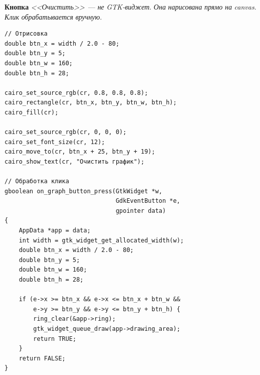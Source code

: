 \textbf{Кнопка} \emph{<<Очистить>>}~--- \emph{не} \emph{GTK-виджет}.
\emph{Она} \emph{нарисована} \emph{прямо} \emph{на} \emph{canvas}.
\emph{Клик} \emph{обрабатывается} \emph{вручную}.

\begin{listing}[htbp]
\begin{verbatim}
// Отрисовка
double btn_x = width / 2.0 - 80;
double btn_y = 5;
double btn_w = 160;
double btn_h = 28;

cairo_set_source_rgb(cr, 0.8, 0.8, 0.8);
cairo_rectangle(cr, btn_x, btn_y, btn_w, btn_h);
cairo_fill(cr);

cairo_set_source_rgb(cr, 0, 0, 0);
cairo_set_font_size(cr, 12);
cairo_move_to(cr, btn_x + 25, btn_y + 19);
cairo_show_text(cr, "Очистить график");

// Обработка клика
gboolean on_graph_button_press(GtkWidget *w,
                               GdkEventButton *e,
                               gpointer data)
{
    AppData *app = data;
    int width = gtk_widget_get_allocated_width(w);
    double btn_x = width / 2.0 - 80;
    double btn_y = 5;
    double btn_w = 160;
    double btn_h = 28;

    if (e->x >= btn_x && e->x <= btn_x + btn_w &&
        e->y >= btn_y && e->y <= btn_y + btn_h) {
        ring_clear(&app->ring);
        gtk_widget_queue_draw(app->drawing_area);
        return TRUE;
    }
    return FALSE;
}
\end{verbatim}
\caption{Кнопка <<Очистить>>: отрисовка и обработка}
\label{lst:render-button}
\end{listing}




